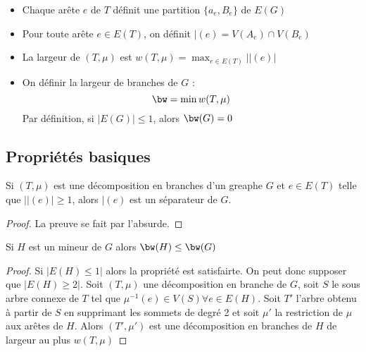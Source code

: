 \documentclass[a4paper, 11pt]{thesis}
\begin{document}
\begin{ex}
    \begin{itemize}
        \item Chaque arête $e$ de $T$ définit une partition $\{a_e, B_e\}$ de $E(G)$
        \item Pour toute arête $e \in E(T)$, on définit $\mid(e) = V(A_e) \cap V(B_e)$
        \item La largeur de $(T, \mu)$ est $w(T, \mu) = \max_{e \in E(T)} |\mid(e)|$
        \item On définir la largeur de branches de $G$ : 
            \begin{displaymath}
                \bw = \min w(T, \mu)
            \end{displaymath}
            Par définition, si $|E(G)| \leq 1$, alors $\bw(G) = 0$
    \end{itemize}
\end{ex}

\subsection{Propriétés basiques}

\begin{prop}
    Si $(T, \mu)$ est une décomposition en branches d'un greaphe $G$ et $e \in E(T)$ telle que
    $|\mid(e)| \geq 1$, alors $\mid(e)$ est un séparateur de $G$.
\end{prop}

\begin{proof}
    La preuve se fait par l'absurde.
\end{proof}

\begin{prop}
    Si $H$ est un mineur de $G$ alors $\bw(H) \leq \bw(G)$
\end{prop}

\begin{ex}
\end{ex}

\begin{proof}
    Si $|E(H) \leq 1|$ alors la propriété est satisfairte. On peut donc supposer que $|E(H) \geq
    2|$. Soit $(T, \mu)$ une décomposition en branche de $G$, soit $S$ le sous arbre connexe de $T$
    tel que $\mu^{-1}(e) \in V(S) \forall e \in E(H)$. Soit $T'$ l'arbre obtenu à partir de $S$ en
    supprimant les sommets de degré 2 et soit $\mu'$ la restriction de $\mu$ aux arêtes de $H$.
    Alors $(T', \mu')$ est une décomposition en branches de $H$ de largeur au plus $w(T, \mu)$
\end{proof}
\end{document}
